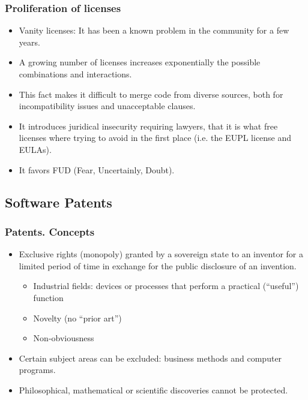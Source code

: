 \begin{frame}
\frametitle{Proliferation of licenses}

\begin{itemize}
\item Vanity licenses: It has been a known problem in the community for a few years.
\item A growing number of licenses increases exponentially the possible combinations and interactions. 
\item This fact makes it difficult to merge code from diverse sources, both for incompatibility issues and unacceptable clauses.
\item It introduces juridical insecurity requiring lawyers, that it is what free licenses where trying to avoid in the first place (i.e. the EUPL license and EULAs).
\item It favors FUD (Fear, Uncertainly, Doubt).
\end{itemize}                                                 

\end{frame}


\subsection{Software Patents}

\begin{frame}
\frametitle{Patents. Concepts}

\begin{itemize}
\item \alert{Exclusive rights} (monopoly) granted by a sovereign state to an inventor for a limited period of time in exchange for the \alert{public disclosure} of an \alert{invention}.
	\begin{itemize}
	\item Industrial fields: devices or processes that perform a practical (``useful'') function
	\item Novelty (no ``prior art'')
	\item Non-obviousness
	\end{itemize}                                                 
\item Certain subject areas can be excluded: business methods and computer programs.
\item Philosophical, mathematical or scientific discoveries cannot be protected.
\end{itemize}                                                 

\end{frame}



